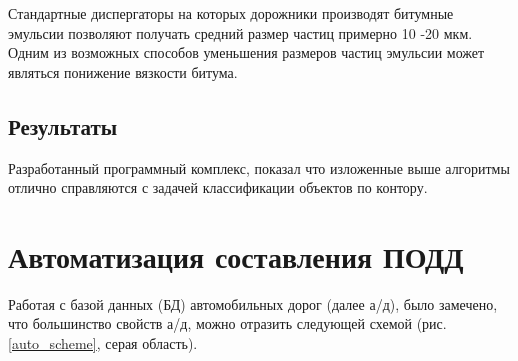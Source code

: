 Стандартные диспергаторы на которых дорожники производят битумные эмульсии позволяют получать средний размер частиц примерно 10 -20 мкм. Одним из возможных способов уменьшения размеров частиц эмульсии может являться понижение вязкости битума.
%
%

\subsection{Результаты}
Разработанный программный комплекс, показал что изложенные выше алгоритмы отлично справляются с задачей классификации объектов по контору.

\section{Автоматизация составления ПОДД}
Работая с базой данных (БД) автомобильных дорог (далее а/д), было замечено, что большинство свойств а/д, можно отразить следующей схемой (рис. \ref{auto_scheme}, серая область). 

